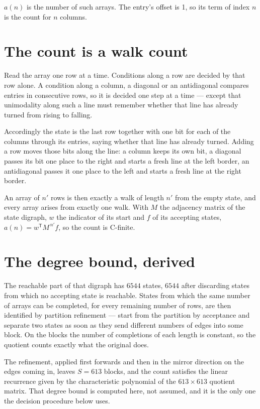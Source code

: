 \documentclass[11pt]{article}
\theoremstyle{definition}
\begin{document}
$a(n)$ is the number of such arrays. The entry's offset is 1, so its term of index $n$ is the count for $n$ columns.

\section{The count is a walk count}

Read the array one row at a time. Conditions along a row are decided by that row alone. A condition along a column, a diagonal or an antidiagonal compares entries in consecutive rows, so it is decided one step at a time --- except that unimodality along such a line must remember whether that line has already turned from rising to falling.

Accordingly the state is the last row together with one bit for each of the columns through its entries, saying whether that line has already turned. Adding a row moves those bits along the line: a column keeps its own bit, a diagonal passes its bit one place to the right and starts a fresh line at the left border, an antidiagonal passes it one place to the left and starts a fresh line at the right border.

An array of $n'$ rows is then exactly a walk of length $n'$ from the empty state, and every array arises from exactly one walk. With $M$ the adjacency matrix of the state digraph, $w$ the indicator of its start and $f$ of its accepting states, $a(n) = w^{\mathsf T}M^{\,n'}f$, so the count is C-finite.

\section{The degree bound, derived}

The reachable part of that digraph has $6544$ states, $6544$ after discarding states from which no accepting state is reachable. States from which the same number of arrays can be completed, for every remaining number of rows, are then identified by partition refinement --- start from the partition by acceptance and separate two states as soon as they send different numbers of edges into some block. On the blocks the number of completions of each length is constant, so the quotient counts exactly what the original does.

The refinement, applied first forwards and then in the mirror direction on the edges coming in, leaves $S = 613$ blocks, and the count satisfies the linear recurrence given by the characteristic polynomial of the $613 \times 613$ quotient matrix. That degree bound is computed here, not assumed, and it is the only one the decision procedure below uses.
\end{document}
